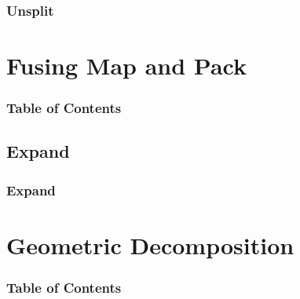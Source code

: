 \documentclass[xcolor=dvipsnames]{beamer}
\begin{document}
		\begin{frame} \frametitle{Unsplit}
	
		\end{frame}
	


\section{Fusing Map and Pack} 

	\begin{frame} \frametitle{Table of Contents}
		\tableofcontents[currentsection]
	\end{frame} 
	
	\subsection{Expand}
		\begin{frame} \frametitle{Expand}
		
		\end{frame}


\section{Geometric Decomposition} 

	\begin{frame} \frametitle{Table of Contents}
		\tableofcontents[currentsection]
	\end{frame} 
\end{document}
